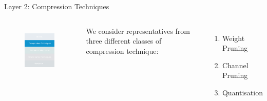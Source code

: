 \documentclass[xcolor=dvipsnames]{beamer}
\begin{document}






\begin{frame}{Layer 2: Compression Techniques}

\begin{columns}
\begin{figure}
    \centering
    \includegraphics[width=3.5cm]{images/compressions.pdf}
    \label{fig:inference-stack-compress-1}
\end{figure}

We consider representatives from three different classes of compression technique:
\begin{enumerate}
    \item Weight Pruning
    \item Channel Pruning
    \item Quantisation
\end{enumerate}


\end{columns}

\end{frame}
\end{document}
